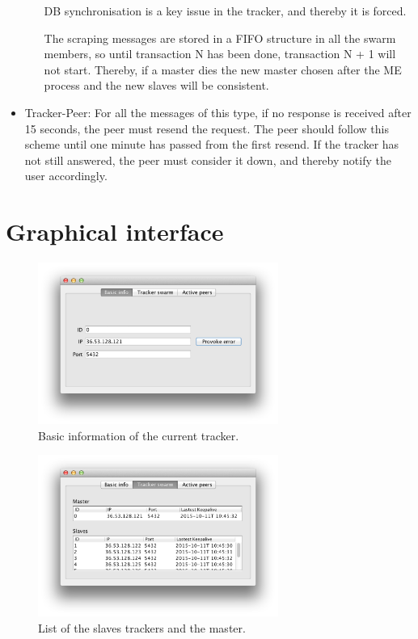 \documentclass[twoside,a4paper,10pt]{article}
\begin{document}
\begin{itemize}
\begin{enumerate}
    DB synchronisation is a key issue in the tracker, and thereby it is forced.

    The scraping messages are stored in a FIFO structure in all the swarm
    members, so until transaction N has been done, transaction N + 1 will not
    start. Thereby, if a master dies the new master chosen after the ME process
    and the new slaves will be consistent.
    
  \end{enumerate}
\item Tracker-Peer: For all the messages of this type, if no response is
  received after 15 seconds, the peer must resend the request. The peer should
  follow this scheme until one minute has passed from the first resend. If the
  tracker has not still answered, the peer must consider it down,
  and thereby notify the user accordingly.
\end{itemize}

\section{Graphical interface}

\begin{figure}[!htp]
  \centering
  \includegraphics[width=0.7\textwidth]{imgs/tracker/basicInfo.png}
  \caption{\label{fig:basicInfo}Basic information of the current tracker.}
\end{figure}

\begin{figure}[!htp]
  \centering
  \includegraphics[width=0.7\textwidth]{imgs/tracker/trakerSwarm.png}
  \caption{\label{fig:trackerSwarm}List of the slaves trackers and the master.}
\end{figure}
\end{document}
